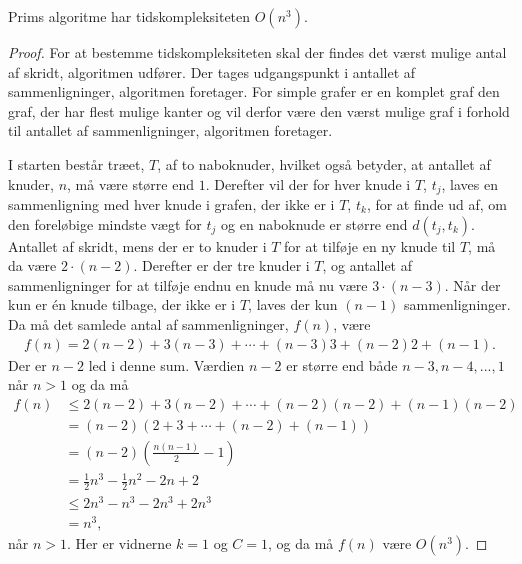 \begin{thm}
	Prims algoritme har tidskompleksiteten $O (n^3)$.
	\label{prim_kompl}
\end{thm}
\begin{proof}
	For at bestemme tidskompleksiteten skal der findes det værst mulige antal af skridt, algoritmen udfører.
	Der tages udgangspunkt i antallet af sammenligninger, algoritmen foretager.
	For simple grafer er en komplet graf den graf, der har flest mulige kanter og vil derfor være den værst mulige graf i forhold til antallet af sammenligninger, algoritmen foretager.

	I starten består træet, $T$, af to naboknuder, hvilket også betyder, at antallet af knuder, $n$, må være større end $1$.
	Derefter vil der for hver knude i $T$, $t_j$, laves en sammenligning med hver knude i grafen, der ikke er i $T$, $t_k$, for at finde ud af, om den foreløbige mindste vægt for $t_j$ og en naboknude er større end $d(t_j, t_k)$.
	Antallet af skridt, mens der er to knuder i $T$ for at tilføje en ny knude til $T$, må da være $2 \cdot (n - 2)$.
	Derefter er der tre knuder i $T$, og antallet af sammenligninger for at tilføje endnu en knude må nu være $3 \cdot (n - 3)$.
	Når der kun er én knude tilbage, der ikke er i $T$, laves der kun $(n-1)$ sammenligninger.
	Da må det samlede antal af sammenligninger, $f(n)$, være
	\begin{align*}
		f(n) = 2 (n-2) + 3(n-3) + \dotsb + (n-3) 3 + (n-2) 2 + (n -1).
	\end{align*}
	Der er $n -2$ led i denne sum. Værdien $n-2$ er større end både $n-3, n-4, ..., 1$ når $n > 1$ og da må
	\begin{align*}
		f(n)
		&\leq 2 (n-2) + 3 (n-2) + \dotsb + (n-2) (n-2) + (n-1) (n-2) \\
		&= (n-2) \left( 2 + 3 + \dotsb + (n-2) + (n-1) \right) \\
		&= (n-2) \left( \frac{n(n-1)}{2} - 1 \right) \\
		&= \frac{1}{2} n^3 - \frac{1}{2} n^2 - 2n + 2 \\
		&\leq 2n^3 - n^3 - 2n^3 + 2n^3 \\
		&= n^3,
	\end{align*}
	når $n > 1$. Her er vidnerne $k=1$ og $C=1$, og da må $f(n)$ være $O(n^3)$.
\end{proof}
